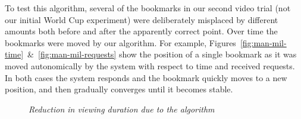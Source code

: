 \documentclass[a4paper,11pt]{article}
\newcommand{\capttext}{\protect\centering\em}
\newcommand{\todo}[1]{
    \fbox{
        \color{red}
        \small
        \sf TODO: #1
    }
}
\begin{document}
To test this algorithm, several of the bookmarks in our second video trial (not our initial World Cup experiment) were deliberately misplaced by different amounts both before and after the apparently correct point. Over time the bookmarks were moved by our algorithm. For example, Figures~\ref{fig:man-mil-time}~\&~\ref{fig:man-mil-requests} show the position of a single bookmark as it was moved autonomically by the system with respect to time and received requests. In both cases the system responds and the bookmark quickly moves to a new position, and then gradually converges until it becomes stable.

\begin{figure}[tbp]
    \centering


    \caption{\capttext Reduction in viewing duration due to the algorithm}

\end{figure}

\end{document}
